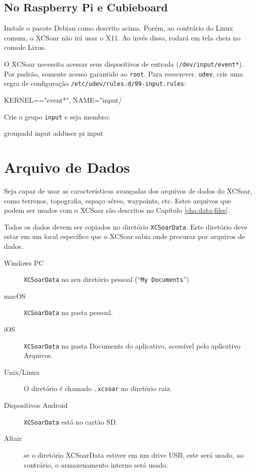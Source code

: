 \subsection*{No Raspberry Pi e Cubieboard}

Instale o pacote Debian como descrito acima.  Porém, ao contrário do Linux comum, o XCSoar não irá usar o X11.  Ao invés disso, rodará em tela cheia no console Lixus.

O XCSoar necessita acessar seus dispositivos de entrada
(\texttt{/dev/input/event*}).  Por padrão, somente acesso garantido ao \texttt{root}.  Para reescrever,  \texttt{udev}, crie uma regra de configuração \texttt{/etc/udev/rules.d/99-input.rules}:

\begin{verbatim*}
KERNEL=="event*", NAME="input/%
\end{verbatim*}

Crie o grupo \texttt{input} e seja membro:

\begin{verbatim*}
groupadd input
adduser pi input
\end{verbatim*}

\section{Arquivo de Dados}\label{sec:data files}

Seja capaz de usar as características avançadas dos arquivos de dados do XCSoar, como terrenos, topografia, espaço aéreo, waypoints, etc.  
Estes arquivos que podem ser usados com o XCSoar são descritos no Capítulo
\ref{cha:data-files}.

Todos os dados devem ser copiados no diretório 
\texttt{XCSoarData}.  Este diretório deve estar em um local específico que o XCSoar sabia onde procurar por arquivos de dados.

\begin{description}
\item[Windows PC]
\texttt{XCSoarData} no seu diretório pessoal (``\texttt{My
Documents}'')
\item[macOS]
\texttt{XCSoarData} na pasta pessoal.
\item[iOS]
\texttt{XCSoarData} na pasta Documents do aplicativo, acessível pelo
aplicativo Arquivos.
\item[Unix/Linux]
O diretório é chamado \verb|.xcsoar| no diretório raiz.
\item[Dispositivos Android]
\texttt{XCSoarData} está no cartão SD.
\item[Altair]
se o diretório XCSoarData estiver em um drive USB, este será usado, ao contrário, o armazenamento interno será usado.
\end{description}


